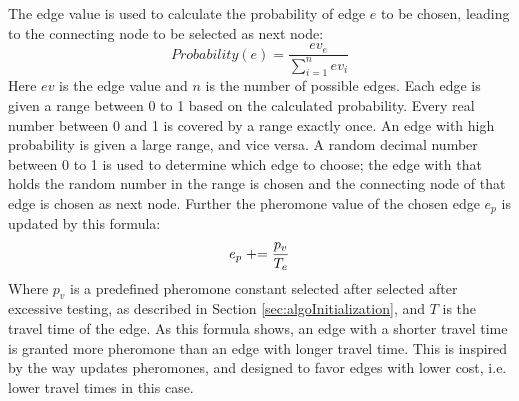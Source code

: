 The edge value is used to calculate the probability of edge $e$ to be chosen, leading to the connecting node to be selected as next node: 
\newline
$$Probability(e) = \frac{ev_e}{\sum\limits^{n}_{i=1}ev_i}$$
\newline
Here $ev$ is the edge value and $n$ is the number of possible edges. Each edge is given a range between 0 to 1 based on the calculated probability. Every real number between 0 and 1 is covered by a range exactly once. An edge with high probability is given a large range, and vice versa. A random decimal number between 0 to 1 is used to determine which edge to choose; the edge with that holds the random number in the range is chosen and the connecting node of that edge is chosen as next node. Further the pheromone value of the chosen edge $e_p$ is updated by this formula:
\newline
$$e_p \mathrel{+}= \frac{p_v}{T_e}$$ 
\newline
Where $p_v$ is a predefined pheromone constant selected after selected after excessive testing, as described in Section \vref{sec:algoInitialization}, and $T$ is the travel time of the edge. As this formula shows, an edge with a shorter travel time is granted more pheromone than an edge with longer travel time. This is inspired by the way \citet{hsiao04} updates pheromones, and designed to favor edges with lower cost, i.e. lower travel times in this case. 